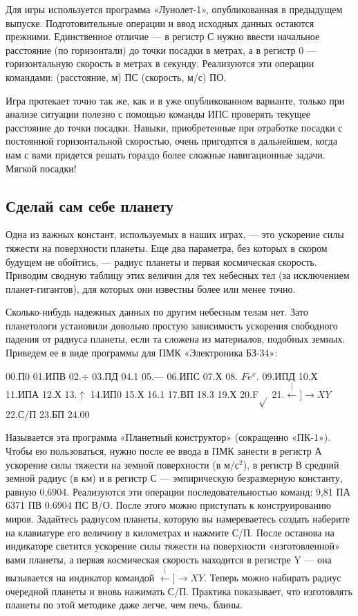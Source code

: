 \documentclass[11pt,a4paper,oneside]{article}
\def\XY{$\stackrel[\leftarrow]{\rightarrow}{XY}$}
\begin{document}
Для игры используется программа «Лунолет-1», опубликованная в предыдущем выпуске. Подготовительные операции и ввод исходных данных остаются прежними. Единственное отличие — в регистр С нужно ввести начальное расстояние (по горизонтали) до точки посадки в метрах, а в регистр 0 — горизонтальную скорость в метрах в секунду. Реализуются эти операции командами: (расстояние, м) ПС (скорость, м/с) ПО.

Игра протекает точно так же, как и в уже опубликованном варианте, только при анализе ситуации полезно с помощью команды ИПС проверять текущее расстояние до точки посадки. Навыки, приобретенные при отработке посадки с постоянной горизонтальной скоростью, очень пригодятся в дальнейшем, когда нам с вами придется решать гораздо более сложные навигационные задачи. Мягкой посадки!

\subsection{Сделай сам себе планету}

Одна из важных констант, используемых в наших играх, — это ускорение силы тяжести на поверхности планеты. Еще два параметра, без которых в скором будущем не обойтись, — радиус планеты и первая космическая скорость. Приводим сводную таблицу этих величин для тех небесных тел (за исключением планет-гигантов), для которых они известны более или менее точно.

Сколько-нибудь надежных данных по другим небесным телам нет. Зато планетологи установили довольно простую зависимость ускорения свободного падения от радиуса планеты, если та сложена из материалов, подобных земных. Приведем ее в виде программы для ПМК «Электроника БЗ-34»:

00.П0 01.ИПВ 02.$\div$ 03.ПД 04.1 05.— 06.ИПС 07.Х 08. $Fe^{x}$. 09.ИПД 10.Х
11.ИПА 12.Х 13.$\uparrow$ 14.ИП0 15.Х 16.1 17.ВП 18.3 19.Х 20.F$\sqrt{}$ 21.\XY 22.С/П 23.БП 24.00

Называется эта программа «Планетный конструктор» (сокращенно «ПК-1»). Чтобы ею пользоваться, нужно после ее ввода в ПМК занести в регистр А ускорение силы тяжести на земной поверхности (в м/с$^{2}$), в регистр В средний земной радиус (в км) и в регистр С — эмпирическую безразмерную константу, равную 0,6904. Реализуются эти операции	последовательностью команд: 9,81 ПА 6371 ПВ 0.6904 ПС В/О. После этого можно приступать к конструированию миров. Задайтесь радиусом планеты, которую вы намереваетесь создать наберите на клавиатуре его величину в километрах и нажмите С/П. После останова на индикаторе светится ускорение силы тяжести на поверхности «изготовленной» вами планеты, а первая космическая скорость находится в регистре Y — она вызывается на индикатор командой \XY. Теперь можно набирать радиус очередной планеты и вновь нажимать С/П. Практика показывает, что изготовлять планеты по этой методике даже легче, чем печь, блины.
\end{document}
